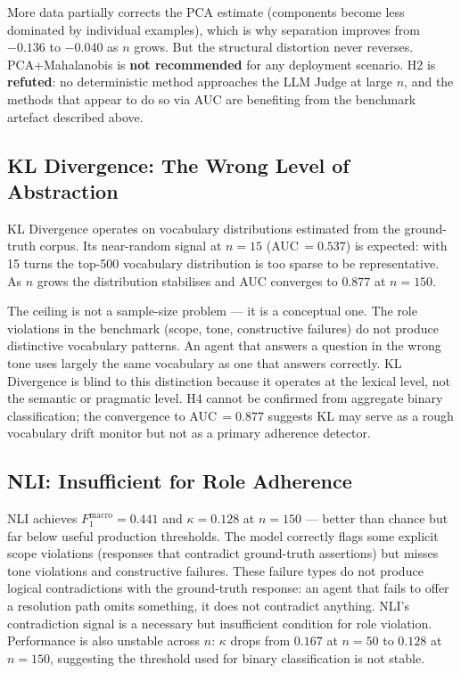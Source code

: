 \documentclass[11pt,a4paper]{article}
\begin{document}
More data partially corrects the PCA estimate (components become less dominated
by individual examples), which is why separation improves from $-0.136$ to
$-0.040$ as $n$ grows. But the structural distortion never reverses.
PCA+Mahalanobis is \textbf{not recommended} for any deployment scenario.
H2 is \textbf{refuted}: no deterministic method approaches the LLM Judge
at large $n$, and the methods that appear to do so via AUC are benefiting
from the benchmark artefact described above.

\subsection{KL Divergence: The Wrong Level of Abstraction}

KL Divergence operates on vocabulary distributions estimated from the
ground-truth corpus. Its near-random signal at $n = 15$ (AUC\,$= 0.537$)
is expected: with 15 turns the top-500 vocabulary distribution is too sparse
to be representative. As $n$ grows the distribution stabilises and AUC
converges to $0.877$ at $n = 150$.

The ceiling is not a sample-size problem --- it is a conceptual one. The role
violations in the benchmark (scope, tone, constructive failures) do not produce
distinctive vocabulary patterns. An agent that answers a question in the wrong
tone uses largely the same vocabulary as one that answers correctly. KL
Divergence is blind to this distinction because it operates at the lexical
level, not the semantic or pragmatic level. H4 cannot be confirmed from
aggregate binary classification; the convergence to AUC\,$= 0.877$ suggests
KL may serve as a rough vocabulary drift monitor but not as a primary adherence
detector.

\subsection{NLI: Insufficient for Role Adherence}

NLI achieves $F_1^{\text{macro}} = 0.441$ and $\kappa = 0.128$ at $n = 150$
--- better than chance but far below useful production thresholds. The model
correctly flags some explicit scope violations (responses that contradict
ground-truth assertions) but misses tone violations and constructive failures.
These failure types do not produce logical contradictions with the ground-truth
response: an agent that fails to offer a resolution path omits something, it
does not contradict anything. NLI's contradiction signal is a necessary but
insufficient condition for role violation. Performance is also unstable across
$n$: $\kappa$ drops from $0.167$ at $n = 50$ to $0.128$ at $n = 150$,
suggesting the threshold used for binary classification is not stable.
\end{document}
